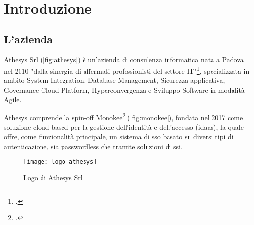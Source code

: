
\chapter{Introduzione}
\label{cap:introduzione}







\section{L'azienda}

Athesys Srl (\autoref{fig:athesys}) è un'azienda di consulenza informatica nata a Padova nel 2010 "dalla sinergia di affermati professionisti del settore IT"\footcite{site:athesys}, specializzata in ambito System Integration, Database Management, Sicurezza applicativa, Governance Cloud Platform, Hyperconvergenza e
Sviluppo Software in modalità Agile.

Athesys comprende la spin-off Monokee\footcite{site:monokee} (\autoref{fig:monokee}), fondata nel 2017 come soluzione cloud-based per la gestione dell'identità
e dell'accesso (\acrfull{idaas}), la quale offre, come funzionalità principale, un sistema di \acrshort{sso} basato 
su diversi tipi di autenticazione, sia passwordless che tramite soluzioni di \acrfull{ssi}.

\vspace{20pt}
\begin{figure}[!h] 
    \centering 
    \texttt{[image: logo-athesys]} 
    \caption{Logo di Athesys Srl}
    \label{fig:athesys}
\end{figure}

